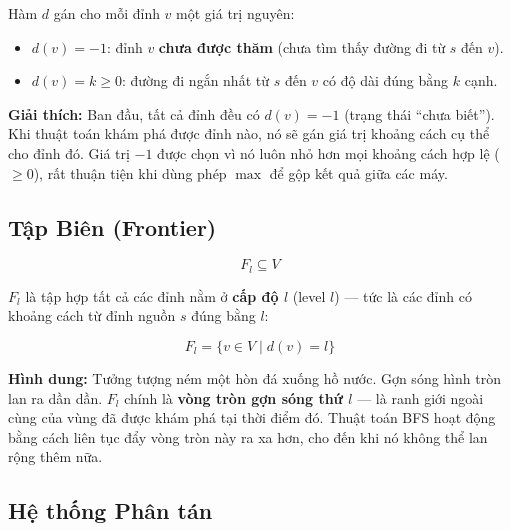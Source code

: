 \documentclass[12pt,a4paper]{article}
\begin{document}
Hàm $d$ gán cho mỗi đỉnh $v$ một giá trị nguyên:
\begin{itemize}
  \item $d(v) = -1$: đỉnh $v$ \textbf{chưa được thăm} (chưa tìm thấy đường đi từ $s$ đến $v$).
  \item $d(v) = k \geq 0$: đường đi ngắn nhất từ $s$ đến $v$ có độ dài đúng bằng $k$ cạnh.
\end{itemize}

\begin{explain}
\textbf{Giải thích:} Ban đầu, tất cả đỉnh đều có $d(v) = -1$ (trạng thái ``chưa biết''). Khi thuật toán khám phá được đỉnh nào, nó sẽ gán giá trị khoảng cách cụ thể cho đỉnh đó. Giá trị $-1$ được chọn vì nó luôn nhỏ hơn mọi khoảng cách hợp lệ ($\geq 0$), rất thuận tiện khi dùng phép $\max$ để gộp kết quả giữa các máy.
\end{explain}

\subsection{Tập Biên (Frontier)}

\begin{equation}
F_l \subseteq V
\end{equation}

$F_l$ là tập hợp tất cả các đỉnh nằm ở \textbf{cấp độ $l$} (level $l$) --- tức là các đỉnh có khoảng cách từ đỉnh nguồn $s$ đúng bằng $l$:

\begin{equation}
F_l = \{v \in V \mid d(v) = l\}
\end{equation}

\begin{explain}
\textbf{Hình dung:} Tưởng tượng ném một hòn đá xuống hồ nước. Gợn sóng hình tròn lan ra dần dần. $F_l$ chính là \textbf{vòng tròn gợn sóng thứ $l$} --- là ranh giới ngoài cùng của vùng đã được khám phá tại thời điểm đó. Thuật toán BFS hoạt động bằng cách liên tục đẩy vòng tròn này ra xa hơn, cho đến khi nó không thể lan rộng thêm nữa.
\end{explain}

\subsection{Hệ thống Phân tán}
\end{document}
